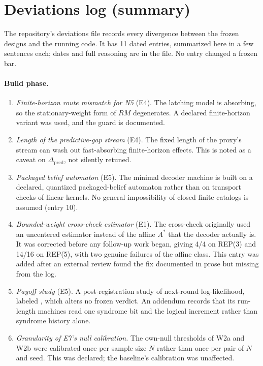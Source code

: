 \section{Deviations log (summary)}
\label{app:deviations}

The repository's deviations file records every divergence between the frozen designs and the running code. It has 11 dated entries, summarized here in a few sentences each; dates and full reasoning are in the file. No entry changed a frozen bar. %

\paragraph{Build phase.}
\begin{enumerate}
\item \emph{Finite-horizon route mismatch for N5} (E4). The latching model is absorbing, so the stationary-weight form of $RM$ degenerates. A declared finite-horizon variant was used, and the guard is documented. %
\item \emph{Length of the predictive-gap stream} (E4). The fixed length of the proxy's stream can wash out fast-absorbing finite-horizon effects. This is noted as a caveat on $\Delta_{\mathrm{pred}}$, not silently retuned. %
\item \emph{Packaged belief automaton} (E5). The minimal decoder machine is built on a declared, quantized packaged-belief automaton rather than on transport checks of linear kernels. No general impossibility of closed finite catalogs is assumed (entry 10). %
\item \emph{Bounded-weight cross-check estimator} (E1). The cross-check originally used an uncentered estimator instead of the affine $A^{*}$ that the decoder actually is. It was corrected before any follow-up work began, giving 4/4 on REP(3) and 14/16 on REP(5), with two genuine failures of the affine class. This entry was added after an external review found the fix documented in prose but missing from the log. %
\item \emph{Payoff study} (E5). A post-registration study of next-round log-likelihood, labeled \gMeasured, which alters no frozen verdict. An addendum records that its run-length machines read one syndrome bit and the logical increment rather than syndrome history alone. %
\item \emph{Granularity of E7's null calibration.} The own-null thresholds of W2a and W2b were calibrated once per sample size $N$ rather than once per pair of $N$ and seed. This was declared; the baseline's calibration was unaffected. %

\end{enumerate}
